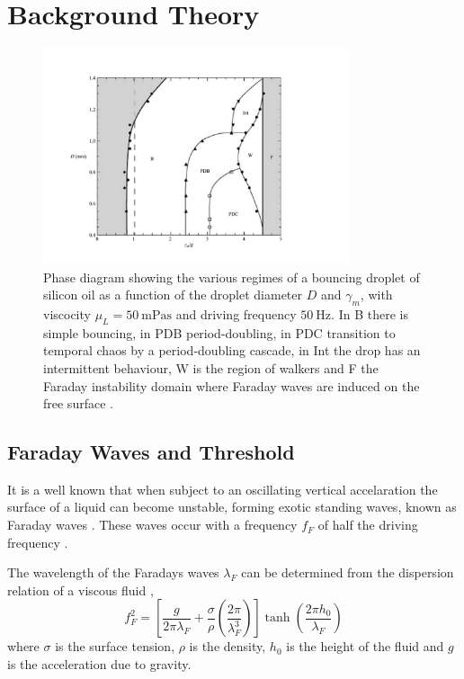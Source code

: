 \documentclass[11pt,twocolumn]{article}
\begin{document}
\section{Background Theory}
\label{secbackgroundtheory}
\begin{figure}[t]
    \centering
    \includegraphics[trim={25mm 15mm 25mm 15mm},clip,width=0.8\textwidth]{PhaseDiagram.pdf}
    \caption{Phase diagram showing the various regimes of a bouncing droplet of silicon oil as a function of the droplet diameter $D$ and $\gamma_m$, with viscocity $\mu_L=\SI{50}{\milli\pascal\second}$ and driving frequency $\SI{50}{\hertz}$.  In B there is simple bouncing, in PDB period-doubling, in PDC transition to temporal chaos by a period-doubling cascade, in Int the drop has an intermittent behaviour, W is the region of walkers and F the Faraday instability domain where Faraday waves are induced on the free surface \cite{9}.}
    \label{figphasediagram}
    \end{figure}


\subsection{Faraday Waves and Threshold}
\label{secfaradaywavesandthreshold}

It is a well known that when subject to an oscillating vertical accelaration the surface of a liquid can become unstable, forming exotic standing waves, known as Faraday waves \cite{20}.  These waves occur with a frequency $f_F$ of half the driving frequency \cite{15}.

The wavelength of the Faradays waves $\lambda_F$ can be determined from the dispersion relation of a viscous fluid \cite{8},
\begin{equation}
    \label{disp_rel}
    f_F^2=\left[\frac{g}{2\pi\lambda_F}+\frac{\sigma}{\rho}\left(\frac{2\pi}{\lambda_F^3}\right)\right]\tanh\left(\frac{2\pi h_0}{\lambda_F}\right)
\end{equation}
where $\sigma$ is the surface tension, $\rho$ is the density, $h_0$ is the height of the fluid and $g$ is the acceleration due to gravity.  %
\end{document}
